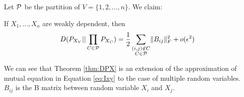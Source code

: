 Let $\P$ be the partition of $V=\{1,2,\dots, n\}$. We claim:
\begin{theorem}\label{thm:DPX}
If $X_1, \dots, X_n$ are weakly dependent, then
\begin{equation}\label{eq:PXV}
D(P_{X_V} || \prod_{C\in \P} P_{X_{C}}) = {1 \over 2}\sum_{\substack{(i,j) \not\in C\\ C\in \P}} \norm{B_{ij}}_F^2 + o(\epsilon^2)
\end{equation}
\end{theorem}
We can see that Theorem \ref{thm:DPX} is an extension of the approximation of mutual equation in Equation \eqref{eq:Ixy} to the case of multiple random variables.
$B_{ij}$ is the B matrix between random variable $X_i$ and $X_j$.

